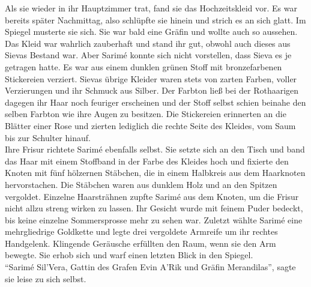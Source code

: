 Als sie wieder in ihr Hauptzimmer trat, fand sie das Hochzeitskleid vor. Es war bereits später 
Nachmittag, also schlüpfte sie hinein und strich es an sich glatt. Im Spiegel musterte sie sich. 
Sie war bald eine Gräfin und wollte auch so aussehen. Das Kleid war wahrlich zauberhaft und stand 
ihr gut, obwohl auch dieses aus Sievas Bestand war. Aber Sarimé konnte sich nicht vorstellen, dass 
Sieva es je getragen hatte. Es war aus einem dunklen grünen Stoff mit bronzefarbenen Stickereien 
verziert. Sievas übrige Kleider waren stets von zarten Farben, voller Verzierungen und ihr Schmuck 
aus Silber. Der Farbton ließ bei der Rothaarigen dagegen ihr Haar noch feuriger erscheinen und der 
Stoff selbst schien beinahe den selben Farbton wie ihre Augen zu besitzen. Die Stickereien 
erinnerten an die Blätter einer Rose und zierten lediglich die rechte Seite des Kleides, vom Saum 
bis zur Schulter hinauf. \\
Ihre Frisur richtete Sarimé ebenfalls selbst. Sie setzte sich an den Tisch und band das Haar mit 
einem Stoffband in der Farbe des Kleides hoch und fixierte den Knoten mit fünf hölzernen Stäbchen, 
die in einem Halbkreis aus dem Haarknoten hervorstachen. Die Stäbchen waren aus dunklem Holz und an 
den Spitzen vergoldet. Einzelne Haarsträhnen zupfte Sarimé aus dem Knoten, um die Frisur nicht 
allzu streng wirken zu lassen. Ihr Gesicht wurde mit feinem Puder bedeckt, bis keine einzelne 
Sommersprosse mehr zu sehen war. Zuletzt wählte Sarimé eine mehrgliedrige Goldkette und legte drei 
vergoldete Armreife um ihr rechtes Handgelenk. Klingende Geräusche erfüllten den Raum, wenn sie den 
Arm bewegte. Sie erhob sich und warf einen letzten Blick in den Spiegel.\\
``Sarimé Sil'Vera, Gattin des Grafen Evin A'Rik und Gräfin Merandilas'', sagte sie leise zu sich 
selbst.\\


